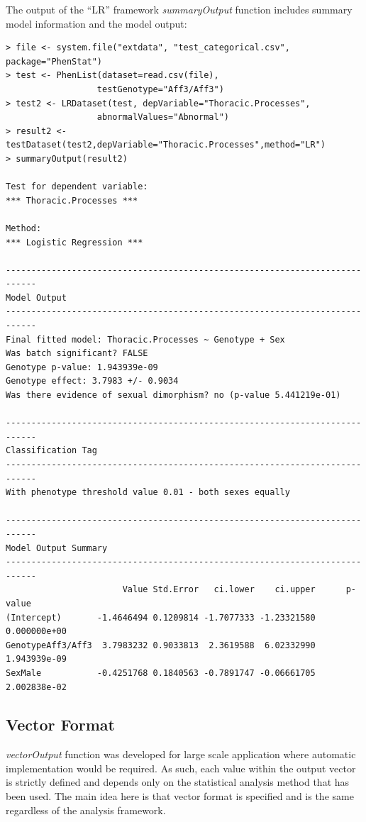 \documentclass[12pt,a4paper]{article}
\begin{document}
The output of the “LR” framework \textit{summaryOutput} function includes summary model information and the model output: 
\begingroup
\fontsize{8pt}{12pt}\selectfont
\begin{verbatim}
> file <- system.file("extdata", "test_categorical.csv", package="PhenStat")
> test <- PhenList(dataset=read.csv(file),
                  testGenotype="Aff3/Aff3")
> test2 <- LRDataset(test, depVariable="Thoracic.Processes",
				  abnormalValues="Abnormal")
> result2 <-testDataset(test2,depVariable="Thoracic.Processes",method="LR")
> summaryOutput(result2)

Test for dependent variable:
*** Thoracic.Processes ***

Method:
*** Logistic Regression ***

----------------------------------------------------------------------------
Model Output
----------------------------------------------------------------------------
Final fitted model: Thoracic.Processes ~ Genotype + Sex
Was batch significant? FALSE
Genotype p-value: 1.943939e-09
Genotype effect: 3.7983 +/- 0.9034
Was there evidence of sexual dimorphism? no (p-value 5.441219e-01)

----------------------------------------------------------------------------
Classification Tag
----------------------------------------------------------------------------
With phenotype threshold value 0.01 - both sexes equally

----------------------------------------------------------------------------
Model Output Summary
----------------------------------------------------------------------------
                       Value Std.Error   ci.lower    ci.upper      p-value
(Intercept)       -1.4646494 0.1209814 -1.7077333 -1.23321580 0.000000e+00
GenotypeAff3/Aff3  3.7983232 0.9033813  2.3619588  6.02332990 1.943939e-09
SexMale           -0.4251768 0.1840563 -0.7891747 -0.06661705 2.002838e-02
\end{verbatim}
\endgroup
\subsection{Vector Format}
\label{section:vectorOutput}
\textit{vectorOutput} function was developed for large scale application where automatic implementation would be required. 
As such, each value within the output vector is strictly defined and depends only on the statistical analysis method that has been used. 
The main idea here is that vector format is specified and is the same regardless of the analysis framework.
\end{document}

